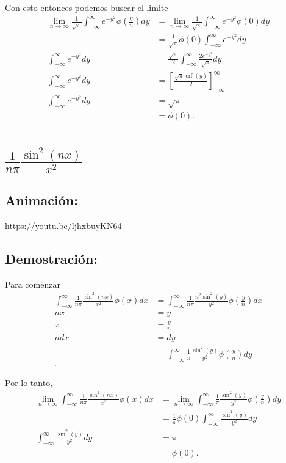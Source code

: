 \documentclass{report}   
\DeclareMathOperator\erf{erf}
\begin{document}
Con esto entonces podemos buscar el limite
\begin{align*}
  \lim_{n \to \infty} \frac{1}{\sqrt{\pi} }\int_{-\infty}^{\infty} e^{-y^2}\phi\left( \frac{y}{n} \right) dy&= \lim_{n \to \infty} \frac{1}{\sqrt{\pi} } \int_{-\infty}^{\infty}e^{-y^2}\phi\left( 0 \right) dy\\
  &= \frac{1}{\sqrt{\pi} }\phi\left( 0 \right) \int_{-\infty}^{\infty} e^{-y^2}dy \\
  \int_{-\infty}^{\infty} e^{-y^2}dy &= \frac{\sqrt{\pi} }{2} \int_{-\infty}^{\infty} \frac{2e^{-y^2}}{\sqrt{\pi} }dy \\
  \int_{-\infty}^{\infty} e^{-y^2}dy &= \left[ \frac{\sqrt{\pi}\erf\left( y \right)  }{2} \right]_{-\infty}^{\infty} \\
  \int_{-\infty}^{\infty} e^{-y^2}dy &= \sqrt{\pi}  \\
  &= \phi\left( 0 \right)
.\end{align*}

\section{$\frac{1}{n\pi}\frac{\sin^2\left( nx \right) }{x^2}$}

\subsection{Animación:}

\url{https://youtu.be/ljhxbuyKN64}

\subsection{Demostración:}
Para comenzar
\begin{align*}
  \int_{-\infty}^{\infty} \frac{1}{n\pi} \frac{\sin^2\left( nx \right) }{x^2} \phi\left( x \right) dx &= \int_{-\infty}^{\infty} \frac{1}{n\pi} \frac{n^2 \sin^2\left( y \right) }{y^2} \phi\left( \frac{y}{n} \right) dx \\
  nx &= y \\
  x &= \frac{y}{n} \\
  n dx &= dy \\
  &= \int_{-\infty}^{\infty} \frac{1}{\pi} \frac{\sin^2\left( y \right) }{y^2}\phi\left( \frac{y}{n} \right) dy \\
.\end{align*}

Por lo tanto,
\begin{align*}
  \lim_{n \to \infty} \int_{-\infty}^{\infty} \frac{1}{n\pi} \frac{\sin^2\left( nx \right) }{x^2}\phi\left( x \right) dx &= \lim_{n \to \infty}  \int_{-\infty}^{\infty} \frac{1}{\pi} \frac{\sin^2\left( y \right) }{y^2}\phi\left( \frac{y}{n} \right) dy \\
  &= \frac{1}{\pi} \phi\left( 0 \right) \int_{-\infty}^{\infty} \frac{\sin^2\left( y \right) }{y^2} dy \\
  \int_{-\infty}^{\infty} \frac{\sin^2\left( y \right) }{y^2} dy &= \pi \\
  &= \phi\left( 0 \right) 
.\end{align*}
\end{document}
